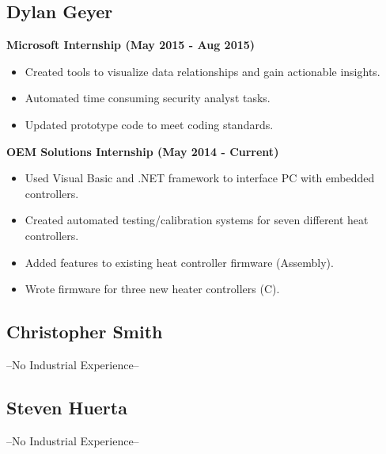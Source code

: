 % 

\subsection{Dylan Geyer}
\large{\textbf{Microsoft Internship (May 2015 - Aug 2015)}}
\begin{itemize}
	\item Created tools to visualize data relationships and gain actionable insights.
	\item Automated time consuming security analyst tasks.
	\item Updated prototype code to meet coding standards.
\end{itemize}
\large{\textbf{OEM Solutions Internship (May 2014 - Current)}}
\begin{itemize}
	\item Used Visual Basic and .NET framework to interface PC with embedded controllers.
	\item Created automated testing/calibration systems for seven different heat controllers.
	\item Added features to existing heat controller firmware (Assembly).
	\item Wrote firmware for three new heater controllers (C).
\end{itemize}
% 

\subsection{Christopher Smith}
--No Industrial Experience--
% 

\subsection{Steven Huerta}
--No Industrial Experience--
